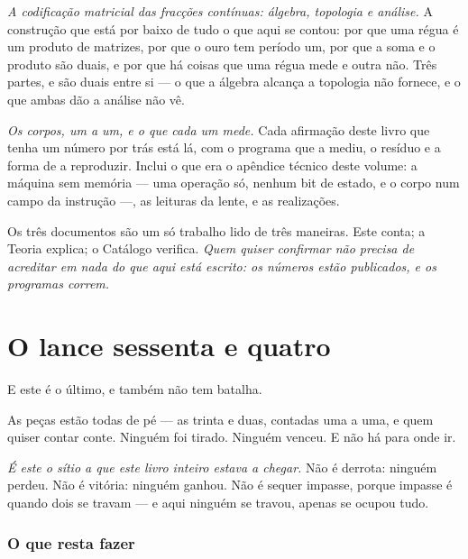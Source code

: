 \documentclass[livro.tex]{subfiles}
\begin{document}
\begin{description}\itemsep6pt

\item[A Teoria.] \emph{A codificação matricial das fracções contínuas: álgebra, topologia e
análise.} A construção que está por baixo de tudo o que aqui se contou: por que uma régua é um
produto de matrizes, por que o ouro tem período um, por que a soma e o produto são duais, e por que
há coisas que uma régua mede e outra não. Três partes, e são duais entre si --- o que a álgebra
alcança a topologia não fornece, e o que ambas dão a análise não vê.

\item[O Catálogo.] \emph{Os corpos, um a um, e o que cada um mede.} Cada afirmação deste livro que
tenha um número por trás está lá, com o programa que a mediu, o resíduo e a forma de a reproduzir.
Inclui o que era o apêndice técnico deste volume: a máquina sem memória --- uma operação só,
nenhum bit de estado, e o corpo num campo da instrução ---, as leituras da lente,
e as realizações.

\end{description}

\noindent Os três documentos são um só trabalho lido de três maneiras. Este conta; a Teoria explica;
o Catálogo verifica. \emph{Quem quiser confirmar não precisa de acreditar em nada do que aqui está
escrito: os números estão publicados, e os programas correm.}



\chapter{O lance sessenta e quatro}

E este é o último, e também não tem batalha.

\medskip

As peças estão todas de pé --- as trinta e duas, contadas uma a uma, e quem quiser contar conte.
Ninguém foi tirado. Ninguém venceu. E não há para onde ir.

\medskip

\emph{É este o sítio a que este livro inteiro estava a chegar.} Não é derrota: ninguém perdeu. Não
é vitória: ninguém ganhou. Não é sequer impasse, porque impasse é quando dois se travam --- e aqui
ninguém se travou, apenas se ocupou tudo.

\subsection*{O que resta fazer}
\end{document}
